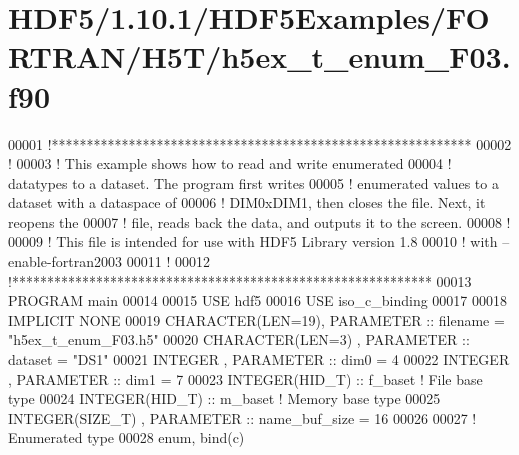 \hypertarget{_h_d_f5_21_810_81_2_h_d_f5_examples_2_f_o_r_t_r_a_n_2_h5_t_2h5ex__t__enum___f03_8f90_source}{}\section{H\+D\+F5/1.10.1/\+H\+D\+F5\+Examples/\+F\+O\+R\+T\+R\+A\+N/\+H5\+T/h5ex\+\_\+t\+\_\+enum\+\_\+\+F03.f90}
\label{_h_d_f5_21_810_81_2_h_d_f5_examples_2_f_o_r_t_r_a_n_2_h5_t_2h5ex__t__enum___f03_8f90_source}

\begin{DoxyCode}
00001 \textcolor{comment}{!************************************************************}
00002 \textcolor{comment}{!}
00003 \textcolor{comment}{!  This example shows how to read and write enumerated}
00004 \textcolor{comment}{!  datatypes to a dataset.  The program first writes}
00005 \textcolor{comment}{!  enumerated values to a dataset with a dataspace of}
00006 \textcolor{comment}{!  DIM0xDIM1, then closes the file.  Next, it reopens the}
00007 \textcolor{comment}{!  file, reads back the data, and outputs it to the screen.}
00008 \textcolor{comment}{!}
00009 \textcolor{comment}{!  This file is intended for use with HDF5 Library version 1.8}
00010 \textcolor{comment}{!  with --enable-fortran2003}
00011 \textcolor{comment}{!}
00012 \textcolor{comment}{!************************************************************}
00013 \textcolor{keyword}{PROGRAM} main
00014 
00015   \textcolor{keywordtype}{USE }hdf5
00016   \textcolor{keywordtype}{USE }iso\_c\_binding
00017 
00018   \textcolor{keywordtype}{IMPLICIT NONE}
00019   \textcolor{keywordtype}{CHARACTER(LEN=19)}, \textcolor{keywordtype}{PARAMETER} :: filename  = \textcolor{stringliteral}{"h5ex\_t\_enum\_F03.h5"}
00020   \textcolor{keywordtype}{CHARACTER(LEN=3)} , \textcolor{keywordtype}{PARAMETER} :: dataset   = \textcolor{stringliteral}{"DS1"}
00021   \textcolor{keywordtype}{INTEGER}          , \textcolor{keywordtype}{PARAMETER} :: dim0      = 4
00022   \textcolor{keywordtype}{INTEGER}          , \textcolor{keywordtype}{PARAMETER} :: dim1      = 7
00023   \textcolor{keywordtype}{INTEGER(HID\_T)}               :: f\_baset  \textcolor{comment}{! File base type}
00024   \textcolor{keywordtype}{INTEGER(HID\_T)}               :: m\_baset  \textcolor{comment}{! Memory base type}
00025   \textcolor{keywordtype}{INTEGER(SIZE\_T)}  , \textcolor{keywordtype}{PARAMETER} :: name\_buf\_size = 16
00026 
00027 \textcolor{comment}{! Enumerated type}
00028   enum, bind(c)

\end{DoxyCode}
